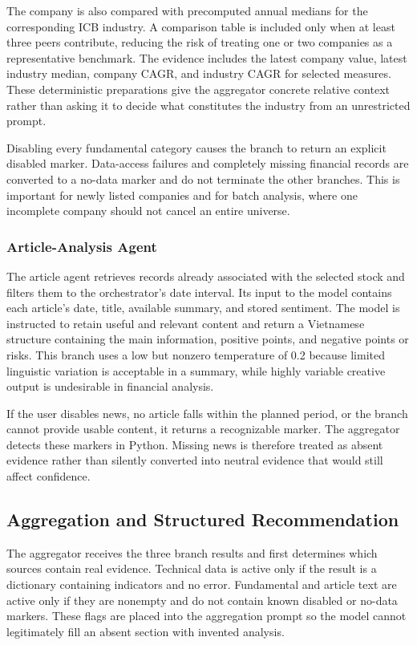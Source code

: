 The company is also compared with precomputed annual medians for the corresponding ICB industry. A comparison table is included only when at least three peers contribute, reducing the risk of treating one or two companies as a representative benchmark. The evidence includes the latest company value, latest industry median, company CAGR, and industry CAGR for selected measures. These deterministic preparations give the aggregator concrete relative context rather than asking it to decide what constitutes the industry from an unrestricted prompt.

Disabling every fundamental category causes the branch to return an explicit disabled marker. Data-access failures and completely missing financial records are converted to a no-data marker and do not terminate the other branches. This is important for newly listed companies and for batch analysis, where one incomplete company should not cancel an entire universe.

\subsubsection{Article-Analysis Agent}
\label{subsubsec:article-analysis-agent}

The article agent retrieves records already associated with the selected stock and filters them to the orchestrator's date interval. Its input to the model contains each article's date, title, available summary, and stored sentiment. The model is instructed to retain useful and relevant content and return a Vietnamese structure containing the main information, positive points, and negative points or risks. This branch uses a low but nonzero temperature of 0.2 because limited linguistic variation is acceptable in a summary, while highly variable creative output is undesirable in financial analysis.

If the user disables news, no article falls within the planned period, or the branch cannot provide usable content, it returns a recognizable marker. The aggregator detects these markers in Python. Missing news is therefore treated as absent evidence rather than silently converted into neutral evidence that would still affect confidence.

\subsection{Aggregation and Structured Recommendation}
\label{subsec:analysis-aggregation}

The aggregator receives the three branch results and first determines which sources contain real evidence. Technical data is active only if the result is a dictionary containing indicators and no error. Fundamental and article text are active only if they are nonempty and do not contain known disabled or no-data markers. These flags are placed into the aggregation prompt so the model cannot legitimately fill an absent section with invented analysis.

